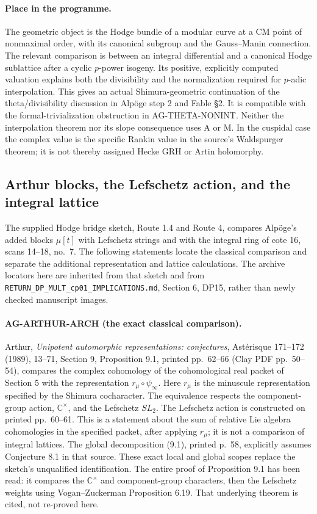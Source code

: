\paragraph{Place in the programme.}
The geometric object is the Hodge bundle of a modular curve at a CM
point of nonmaximal order, with its canonical subgroup and the
Gauss--Manin connection.  The relevant comparison is between an
integral differential and a canonical Hodge sublattice after a cyclic
$p$-power isogeny.  Its positive, explicitly computed valuation
explains both the divisibility and the normalization required for
$p$-adic interpolation.  This gives an actual Shimura-geometric
continuation of the theta/divisibility discussion in Alpöge step 2
and Fable \S2.  It is compatible with the formal-trivialization
obstruction in AG-THETA-NONINT.  Neither the interpolation theorem
nor its slope consequence uses A or M.  In the cuspidal case the
complex value is the specific Rankin value in the source's
Waldspurger theorem; it is not thereby assigned Hecke GRH or
Artin holomorphy.

\subsection{Arthur blocks, the Lefschetz action, and the integral lattice}
\label{ag:arthur}

The supplied Hodge bridge sketch, Route 1.4 and Route 4, compares
Alpöge's added blocks $\mu[t]$ with Lefschetz strings and with the
integral ring of cote 16, scans 14--18, no.~7. The following
statements locate the classical comparison and separate the
additional representation and lattice calculations. The archive
locators here are inherited from that sketch and from
\texttt{RETURN\_DP\_MULT\_cp01\_IMPLICATIONS.md}, Section 6,
DP15, rather than newly checked manuscript images.

\paragraph{AG-ARTHUR-ARCH (the exact classical comparison).}
Arthur, \emph{Unipotent automorphic representations: conjectures},
Astérisque 171--172 (1989), 13--71, Section 9,
Proposition 9.1, printed pp.~62--66 (Clay PDF pp.~50--54),
compares the complex cohomology of the cohomological real packet
of Section 5 with the representation $r_\mu\circ\psi_\infty$.
Here $r_\mu$ is the minuscule representation specified by the
Shimura cocharacter. The equivalence respects the component-group
action, $\mathbb C^\times$, and the Lefschetz $SL_2$.
The Lefschetz action is constructed on printed pp.~60--61.
This is a statement about the sum of relative Lie algebra
cohomologies in the specified packet, after applying $r_\mu$;
it is not a comparison of integral lattices. The global
decomposition (9.1), printed p.~58, explicitly assumes
Conjecture 8.1 in that source. These exact local and global
scopes replace the sketch's unqualified identification.
The entire proof of Proposition 9.1 has been read: it compares
the $\mathbb C^\times$ and component-group characters, then the
Lefschetz weights using Vogan--Zuckerman Proposition 6.19.
That underlying theorem is cited, not re-proved here.

